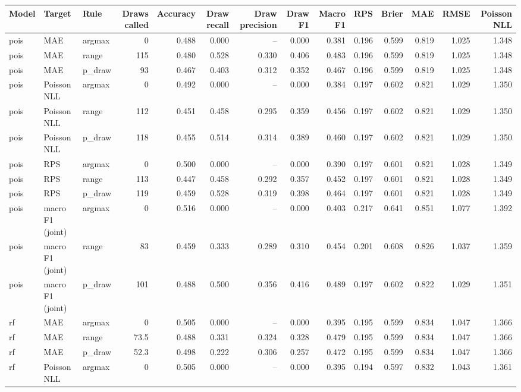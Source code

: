 
\begin{tabular}{lllrrrrrrrrrrr}
\toprule
Model & Target & Rule & Draws called & Accuracy & Draw recall & Draw precision & Draw F1 & Macro F1 & RPS & Brier & MAE & RMSE & Poisson NLL\\
\midrule
pois & MAE & argmax & 0 & 0.488 & 0.000 & -- & 0.000 & 0.381 & 0.196 & 0.599 & 0.819 & 1.025 & 1.348\\
pois & MAE & range & 115 & 0.480 & 0.528 & 0.330 & 0.406 & 0.483 & 0.196 & 0.599 & 0.819 & 1.025 & 1.348\\
pois & MAE & p\_draw & 93 & 0.467 & 0.403 & 0.312 & 0.352 & 0.467 & 0.196 & 0.599 & 0.819 & 1.025 & 1.348\\
pois & Poisson NLL & argmax & 0 & 0.492 & 0.000 & -- & 0.000 & 0.384 & 0.197 & 0.602 & 0.821 & 1.029 & 1.350\\
pois & Poisson NLL & range & 112 & 0.451 & 0.458 & 0.295 & 0.359 & 0.456 & 0.197 & 0.602 & 0.821 & 1.029 & 1.350\\
pois & Poisson NLL & p\_draw & 118 & 0.455 & 0.514 & 0.314 & 0.389 & 0.460 & 0.197 & 0.602 & 0.821 & 1.029 & 1.350\\
pois & RPS & argmax & 0 & 0.500 & 0.000 & -- & 0.000 & 0.390 & 0.197 & 0.601 & 0.821 & 1.028 & 1.349\\
pois & RPS & range & 113 & 0.447 & 0.458 & 0.292 & 0.357 & 0.452 & 0.197 & 0.601 & 0.821 & 1.028 & 1.349\\
pois & RPS & p\_draw & 119 & 0.459 & 0.528 & 0.319 & 0.398 & 0.464 & 0.197 & 0.601 & 0.821 & 1.028 & 1.349\\
pois & macro F1 (joint) & argmax & 0 & 0.516 & 0.000 & -- & 0.000 & 0.403 & 0.217 & 0.641 & 0.851 & 1.077 & 1.392\\
pois & macro F1 (joint) & range & 83 & 0.459 & 0.333 & 0.289 & 0.310 & 0.454 & 0.201 & 0.608 & 0.826 & 1.037 & 1.359\\
pois & macro F1 (joint) & p\_draw & 101 & 0.488 & 0.500 & 0.356 & 0.416 & 0.489 & 0.197 & 0.602 & 0.822 & 1.029 & 1.351\\
rf & MAE & argmax & 0 & 0.505 & 0.000 & -- & 0.000 & 0.395 & 0.195 & 0.599 & 0.834 & 1.047 & 1.366\\
rf & MAE & range & 73.5 & 0.488 & 0.331 & 0.324 & 0.328 & 0.479 & 0.195 & 0.599 & 0.834 & 1.047 & 1.366\\
rf & MAE & p\_draw & 52.3 & 0.498 & 0.222 & 0.306 & 0.257 & 0.472 & 0.195 & 0.599 & 0.834 & 1.047 & 1.366\\
rf & Poisson NLL & argmax & 0 & 0.505 & 0.000 & -- & 0.000 & 0.395 & 0.194 & 0.597 & 0.832 & 1.043 & 1.361\\

\end{tabular}
